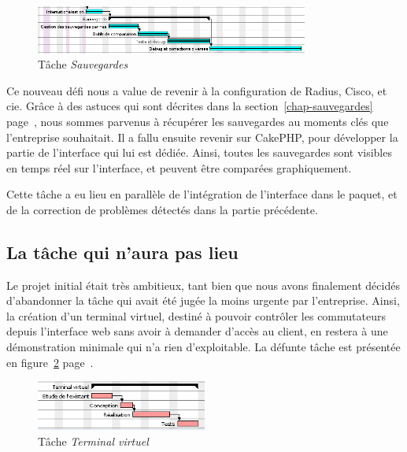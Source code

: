 \begin{figure}[!h]
	\begin{center}
		\includegraphics[width=0.8\textwidth]{img/gantt_sauvegarde.png}
	\end{center}
	\caption{Tâche \textit{Sauvegardes}}
	\label{gantt_sauvegardes}
\end{figure}

Ce nouveau défi nous a value de revenir à la configuration de Radius, Cisco, et cie. Grâce à des astuces qui sont décrites dans la section~\ref{chap-sauvegardes} page~\pageref{chap-sauvegardes}, nous sommes parvenus à récupérer les sauvegardes au moments clés que l'entreprise souhaitait. Il a fallu ensuite revenir sur CakePHP, pour développer la partie de l'interface qui lui est dédiée. Ainsi, toutes les sauvegardes sont visibles en temps réel sur l'interface, et peuvent être comparées graphiquement.

Cette tâche a eu lieu en parallèle de l'intégration de l'interface dans le paquet, et de la correction de problèmes détectés dans la partie précédente.

\subsection{La tâche qui n'aura pas lieu}

Le projet initial était très ambitieux, tant bien que nous avons finalement décidés d'abandonner la tâche qui avait été jugée la moins urgente par l'entreprise. Ainsi, la création d'un terminal virtuel, destiné à pouvoir contrôler les commutateurs depuis l'interface web sans avoir à demander d'accès au client, en restera à une démonstration minimale qui n'a rien d'exploitable. La défunte tâche est présentée en figure~\ref{gantt_terminal} page~\pageref{gantt_terminal}.

\begin{figure}[!h]
	\begin{center}
		\includegraphics[width=0.5\textwidth]{img/gantt_terminal.png}
	\end{center}
	\caption{Tâche \textit{Terminal virtuel}}
	\label{gantt_terminal}
\end{figure}

